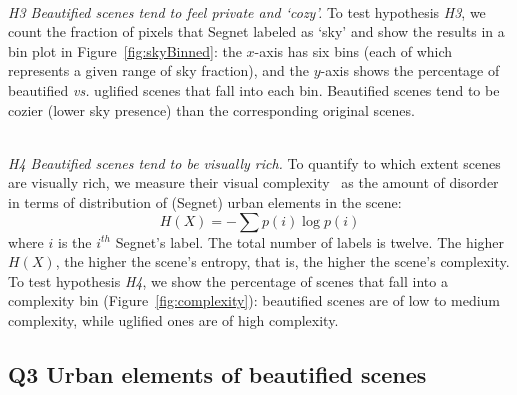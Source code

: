 \mbox{ } \\
\noindent
\emph{H3 Beautified scenes tend to feel private and `cozy'.}
To  test hypothesis \emph{H3}, we count the fraction of pixels that Segnet labeled  as `sky' and show the results in a bin plot in Figure~\ref{fig:skyBinned}:  the $x$-axis has six bins (each of which represents a given range of sky fraction), and the $y$-axis shows the percentage of beautified \emph{vs.} uglified scenes that fall into each bin.  Beautified scenes tend to be cozier (lower sky presence) than the corresponding original scenes.


\mbox{ } \\
\noindent
\emph{H4 Beautified scenes tend to be visually rich.}
To quantify to which extent scenes are visually rich, we measure their visual complexity~\cite{ewing2013measuring} as  the amount of disorder in terms of distribution of (Segnet) urban elements in the scene: 
\begin{equation}
H(X) = -\sum p(i)\log p(i)
\label{eq:entropy} 
\end{equation}
where $i$ is the $i^{th}$ Segnet's label. The total number of labels is twelve. The higher $H(X)$, the  higher the scene's entropy, that is, the higher the scene's complexity. To test hypothesis \emph{H4}, we show the percentage of scenes that fall into a complexity bin  (Figure~\ref{fig:complexity}): beautified scenes are of low to medium complexity, while uglified ones are of high complexity.



\subsection*{Q3 Urban elements of beautified scenes}

\begin{table}[t!]
	\centering
	\caption{Coefficients of logistic regressions run on one pair of predictors at the time.}
	\label{tab:regressioncoef}
    \vspace{-10mm}
\end{table}


